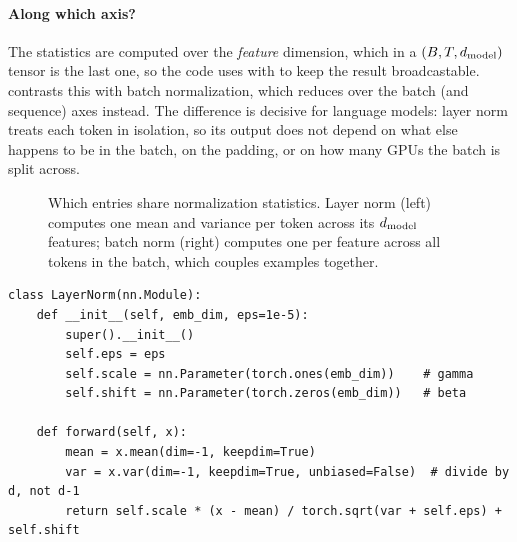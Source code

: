 \paragraph{Along which axis?}
The statistics are computed over the \emph{feature} dimension, which in a $(B,T,d_{\text{model}})$ tensor
is the last one, so the code uses  with  to keep the result
broadcastable.  contrasts this with batch normalization, which reduces
over the batch (and sequence) axes instead. The difference is decisive for language models:
layer norm treats each token in isolation, so its output does not depend on what else happens to
be in the batch, on the padding, or on how many GPUs the batch is split across.

\begin{figure}[t]
\centering
{}
\caption{Which entries share normalization statistics. Layer norm (left) computes one mean and
variance per token across its $d_{\text{model}}$ features; batch norm (right) computes one per feature
across all tokens in the batch, which couples examples together.}
\label{fig:gpt:normaxes}
\end{figure}

\begin{lstlisting}[caption={Layer normalization written out explicitly (as in \ident{llmsys/layers.py}).},label={lst:gpt:ln}]
class LayerNorm(nn.Module):
    def __init__(self, emb_dim, eps=1e-5):
        super().__init__()
        self.eps = eps
        self.scale = nn.Parameter(torch.ones(emb_dim))    # gamma
        self.shift = nn.Parameter(torch.zeros(emb_dim))   # beta

    def forward(self, x):
        mean = x.mean(dim=-1, keepdim=True)
        var = x.var(dim=-1, keepdim=True, unbiased=False)  # divide by d, not d-1
        return self.scale * (x - mean) / torch.sqrt(var + self.eps) + self.shift
\end{lstlisting}

